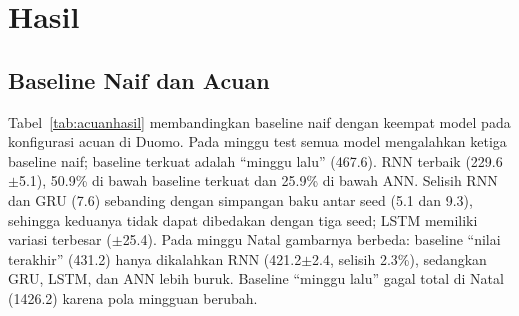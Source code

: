 \documentclass[conference,a4paper]{IEEEtran}
\begin{document}
\section{Hasil}
\subsection{Baseline Naif dan Acuan}
Tabel~\ref{tab:acuanhasil} membandingkan baseline naif dengan keempat model pada konfigurasi acuan di Duomo. Pada minggu test semua model mengalahkan ketiga baseline naif; baseline terkuat adalah ``minggu lalu'' (467.6). RNN terbaik (229.6$\pm$5.1), 50.9\% di bawah baseline terkuat dan 25.9\% di bawah ANN. Selisih RNN dan GRU (7.6) sebanding dengan simpangan baku antar seed (5.1 dan 9.3), sehingga keduanya tidak dapat dibedakan dengan tiga seed; LSTM memiliki variasi terbesar ($\pm$25.4). Pada minggu Natal gambarnya berbeda: baseline ``nilai terakhir'' (431.2) hanya dikalahkan RNN (421.2$\pm$2.4, selisih 2.3\%), sedangkan GRU, LSTM, dan ANN lebih buruk. Baseline ``minggu lalu'' gagal total di Natal (1426.2) karena pola mingguan berubah.
 
\begin{table}[t]
  \centering
  \caption{Hasil konfigurasi acuan di Duomo (rata-rata $\pm$ simpangan baku, 3 seed).}
  \label{tab:acuanhasil}
\end{table}
 
\end{document}
